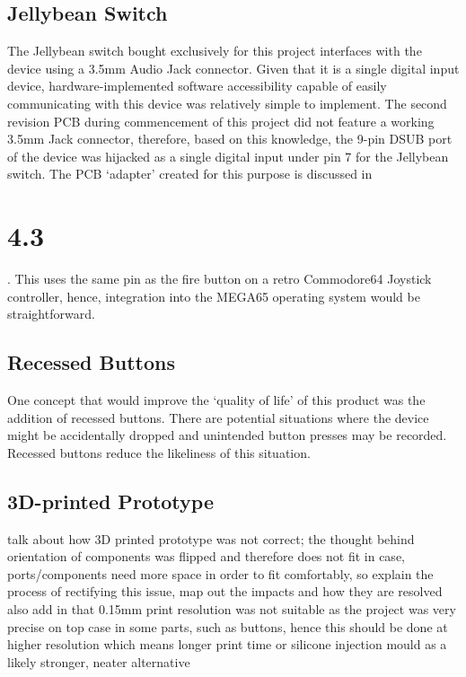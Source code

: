 \subsection{Jellybean Switch}

The Jellybean switch bought exclusively for this project interfaces with the device using a 3.5mm Audio Jack connector. 
Given that it is a single digital input device, hardware-implemented software accessibility capable of easily communicating with this device was relatively simple to implement. 
The second revision PCB during commencement of this project did not feature a working 3.5mm Jack connector, therefore, based on this knowledge, the 9-pin DSUB port of the device was hijacked as a single digital input under pin 7 for the Jellybean switch. 
The PCB ‘adapter’ created for this purpose is discussed in \section{4.3}. %
This uses the same pin as the fire button on a retro Commodore64 Joystick controller, hence, integration into the MEGA65 operating system would be straightforward.

\subsection{Recessed Buttons}


One concept that would improve the ‘quality of life’ of this product was the addition of recessed buttons. 
There are potential situations where the device might be accidentally dropped and unintended button presses may be recorded. 
Recessed buttons reduce the likeliness of this situation.

\subsection{3D-printed Prototype}

talk about how 3D printed prototype was not correct; the thought behind orientation of components was flipped and therefore does not fit in case, ports/components need more space in order to fit comfortably, so explain the process of rectifying this issue, map out the impacts and how they are resolved
also add in that 0.15mm print resolution was not suitable as the project was very precise on top case in some parts, such as buttons, hence this should be done at higher resolution which means longer print time or silicone injection mould as a likely stronger, neater alternative

